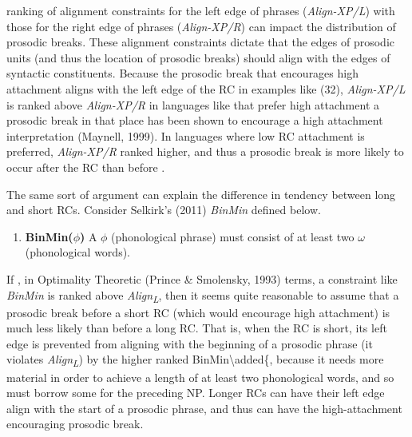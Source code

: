 \documentclass[12pt,oneside]{book}
\providecommand{\tightlist}{%
  \setlength{\itemsep}{0pt}\setlength{\parskip}{0pt}}
\begin{document}
  ranking of alignment constraints for the left edge of phrases (\emph{Align-XP/L}) with those for the right edge of phrases (\emph{Align-XP/R}) can impact the distribution of prosodic breaks. These alignment constraints dictate that the edges of prosodic units (and thus the location of prosodic breaks) should align with the edges of syntactic constituents. Because the prosodic break that encourages high attachment  aligns with the left edge of the RC in examples like (32),  \emph{Align-XP/L} is  ranked above \emph{Align-XP/R} in languages like  that prefer high attachment  a prosodic break in that place has been shown to encourage a high attachment interpretation\deleted{)} (Maynell, 1999). In languages where low RC attachment is preferred,  \emph{Align-XP/R}  ranked higher, and thus a prosodic break is more likely to occur after the RC than before .

The same sort of argument can explain the difference in tendency between long and short RCs. Consider Selkirk's (2011) \emph{BinMin} defined below.

\begin{enumerate}
\def\labelenumi{(\arabic{enumi})}
\setcounter{enumi}{34}
\tightlist
\item
  \textbf{BinMin(\(\phi\))} \linebreak
  A \(\phi\) (phonological phrase) must consist of at least two \(\omega\) (phonological words).
\end{enumerate}

If , in Optimality Theoretic (Prince \& Smolensky, 1993) terms,  a constraint like \emph{BinMin} is ranked above \emph{Align\textsubscript{L}}, then it seems quite reasonable to assume that a prosodic break before a short RC (which would encourage high attachment) is much less likely than before a long RC. That is, when the RC is short, its left edge is prevented from aligning with the beginning of a prosodic phrase (it violates \emph{Align\textsubscript{L}}) by the higher ranked BinMin\textbackslash{}added\{, because it needs more material in order to achieve a length of at least two phonological words, and so must borrow some for the preceding NP. Longer RCs can have their left edge align with the start of a prosodic phrase, and thus can have the high-attachment encouraging prosodic break.
\end{document}
